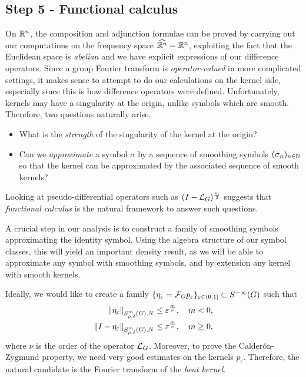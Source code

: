 \subsection*{Step 5 - Functional calculus}

On $\mathbb{R}^n$,
the composition and adjunction formulae can be proved by carrying out our computations on the frequency space ${\widehat{\mathbb{R}^n}} = \mathbb{R}^n$,
exploiting the fact that the Euclidean space is \emph{abelian} and we have explicit expressions of our difference operators.
Since a group Fourier transform is \emph{operator-valued} in more complicated settings,
it makes sense to attempt to do our calculations on the kernel side,
especially since this is how difference operators were defined.
Unfortunately,
kernels may have a singularity at the origin,
unlike symbols which are smooth.
Therefore, two questions naturally arise.

\begin{itemize}
    \item What is the \emph{strength} of the singularity of the kernel at the origin?
    \item Can we \emph{approximate} a symbol $\sigma$ by a sequence of smoothing symbols $(\sigma_n)_{n \in \mathbb{N}}$ so that the kernel can be approximated by the associated sequence of smooth kernels?
\end{itemize}

Looking at pseudo-differential operators such as $(I - {\mathcal{L}_{G}})^\frac{m}{2}$
suggests that \emph{functional calculus} is the natural framework to answer such questions.

A crucial step in our analysis is to construct a family of smoothing symbols approximating the identity symbol.
Using the algebra structure of our symbol classes,
this will yield an important density result,
as we will be able to approximate any symbol with smoothing symbols,
and by extension any kernel with smooth kernels.

Ideally,
we would like to create a family $\{\eta_\varepsilon = \mathcal{F}_{G} p_\varepsilon\}_{\varepsilon \in (0, 1]} \subset {S^{-\infty} (G)}$
such that
\begin{align}
    \SymbolSemiNorm m {\rho, \delta} N {\eta_\epsilon}
    &\leq \epsilon^\frac m \nu,
    \quad m < 0,
    \label{eq:survey:density_estimate:1}
    \\
    \SymbolSemiNorm m {\rho, \delta} N {\Id {} - \eta_\epsilon}
    &\leq \epsilon^\frac m \nu,
    \quad m \geq 0,
    \label{eq:survey:density_estimate:2}
\end{align}
where $\nu$ is the order of the operator ${\mathcal{L}_{G}}$.
Moreover,
to prove the Calder\'on-Zygmund property,
we need very good estimates on the kernels $p_\epsilon$.
Therefore, the natural candidate is the Fourier transform of the \emph{heat kernel}.

